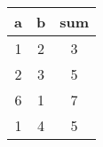 \begin{table}[h]
    \centering
    \begin{tabular}{| c | c | c |}
    \hline
    a & b & sum \\ 
    \hline
    1 & 2 & 3 \\ 
    \hline
    2 & 3 & 5 \\ 
    \hline
    6 & 1 & 7 \\ 
    \hline
    1 & 4 & 5 \\ 
    \hline
    \end{tabular}
\end{table}